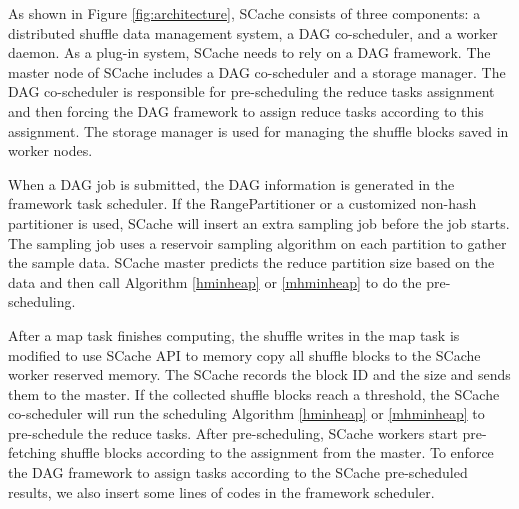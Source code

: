 {\color{blue}
As shown in Figure \ref{fig:architecture}, SCache consists of three components: a distributed shuffle data management system, a DAG co-scheduler, and a worker daemon.
As a plug-in system, SCache needs to rely on a DAG framework. 
The master node of SCache includes a DAG co-scheduler and a storage manager.
The DAG co-scheduler is responsible for pre-scheduling the reduce tasks assignment and then forcing the DAG framework to assign reduce tasks according to this assignment.
The storage manager is used for managing the shuffle blocks saved in worker nodes.

When a DAG job is submitted, the DAG information is generated in the framework task scheduler. 
If the RangePartitioner or a customized non-hash partitioner is used, SCache will insert an extra sampling job before the job starts.
The sampling job uses a reservoir sampling algorithm \cite{reservoir} on each partition to gather the sample data.
SCache master predicts the reduce partition size based on the data and then call Algorithm \ref{hminheap} or \ref{mhminheap} to do the pre-scheduling.

After a map task finishes computing, the shuffle writes in the map task is modified to use SCache API to memory copy all shuffle blocks to the SCache worker reserved memory.
The SCache records the block ID and the size and sends them to the master.
If the collected shuffle blocks reach a threshold, the SCache co-scheduler will run the scheduling Algorithm \ref{hminheap} or \ref{mhminheap} to pre-schedule the reduce tasks.
After pre-scheduling, SCache workers start pre-fetching shuffle blocks according to the assignment from the master.
To enforce the DAG framework to assign tasks according to the SCache pre-scheduled results, we also insert some lines of codes in the framework scheduler.
}

